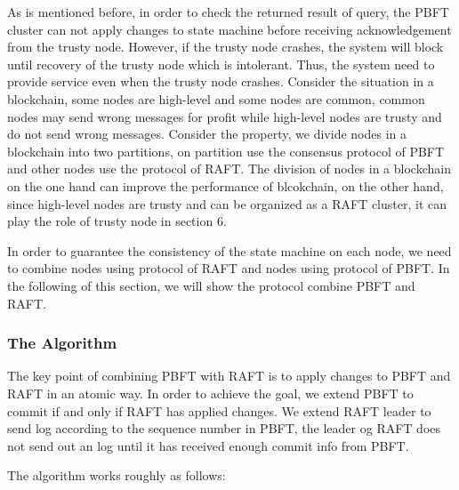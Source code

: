 As is mentioned before, in order to check the returned result of query, the PBFT cluster can not apply changes to state machine before receiving acknowledgement from the trusty node. However, if the trusty node crashes, the system will block until recovery of the trusty node which is intolerant. Thus, the system need to provide service even when the trusty node crashes. Consider the situation in a blockchain, some nodes are high-level and some nodes are common, common nodes may send wrong messages for profit while high-level nodes are trusty and do not send wrong messages. Consider the property, we divide nodes in a blockchain into two partitions, on partition use the consensus protocol of PBFT and other nodes use the protocol of RAFT. The division of nodes in a blockchain on the one hand can improve the performance of blcokchain, on the other hand, since high-level nodes are trusty and can be organized as a RAFT cluster, it can play the role of trusty node in section 6.

In order to guarantee the consistency of the state machine on each node, we need to combine nodes using protocol of RAFT and nodes using protocol of PBFT. In the following of this section, we will show the protocol combine PBFT and RAFT.

\subsubsection{The Algorithm}

The key point of combining PBFT with RAFT is to apply changes to PBFT and RAFT in an atomic way. In order to achieve the goal, we extend PBFT to commit if and only if RAFT has applied changes. We extend RAFT leader to send log according to the sequence number in PBFT, the leader og RAFT does not send out an log until it has received enough commit info from PBFT.

The algorithm works roughly as follows:
